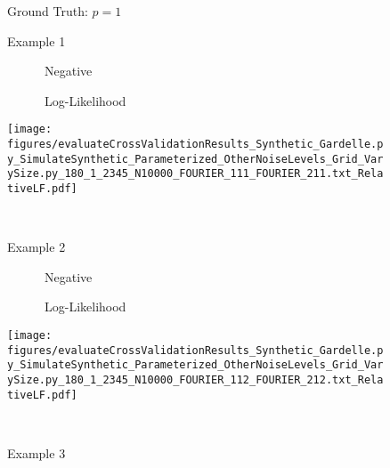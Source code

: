 \begin{figure}
\center

Ground Truth: $p = 1$

Example 1

\begin{minipage}[c]{0.8\linewidth}

\end{minipage}
\begin{minipage}[c]{0.19\linewidth}
\centering

\ \ \ \ \ \ Negative

\ \ \ \ \ \ Log-Likelihood

\texttt{[image: figures/evaluateCrossValidationResults\_Synthetic\_Gardelle.py\_SimulateSynthetic\_Parameterized\_OtherNoiseLevels\_Grid\_VarySize.py\_180\_1\_2345\_N10000\_FOURIER\_111\_FOURIER\_211.txt\_RelativeLF.pdf]}
\end{minipage}

\ 

Example 2

\begin{minipage}[c]{0.8\linewidth}

\end{minipage}
\begin{minipage}[c]{0.19\linewidth}
\centering

\ \ \ \ \ \ Negative

\ \ \ \ \ \ Log-Likelihood

\texttt{[image: figures/evaluateCrossValidationResults\_Synthetic\_Gardelle.py\_SimulateSynthetic\_Parameterized\_OtherNoiseLevels\_Grid\_VarySize.py\_180\_1\_2345\_N10000\_FOURIER\_112\_FOURIER\_212.txt\_RelativeLF.pdf]}
\end{minipage}

\ 

Example 3

\begin{minipage}[c]{0.8\linewidth}


\end{minipage}
\end{figure}
